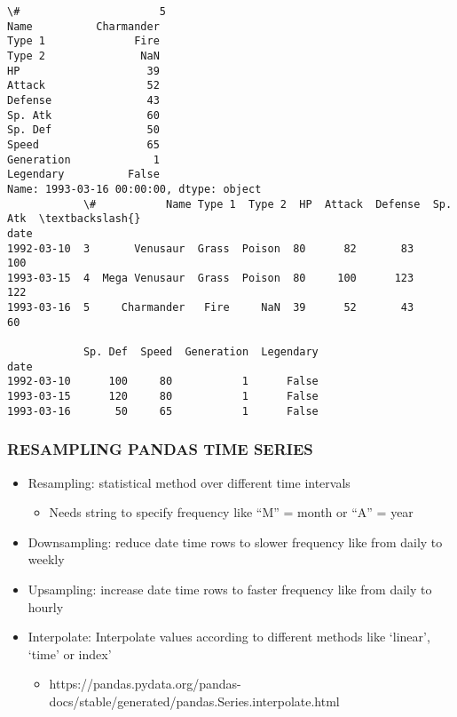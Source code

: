 \documentclass[11pt]{article}
\providecommand{\tightlist}{%
      \setlength{\itemsep}{0pt}\setlength{\parskip}{0pt}}
\begin{document}
    \begin{Verbatim}[commandchars=\\\{\}]
\#                      5
Name          Charmander
Type 1              Fire
Type 2               NaN
HP                    39
Attack                52
Defense               43
Sp. Atk               60
Sp. Def               50
Speed                 65
Generation             1
Legendary          False
Name: 1993-03-16 00:00:00, dtype: object
            \#           Name Type 1  Type 2  HP  Attack  Defense  Sp. Atk  \textbackslash{}
date                                                                        
1992-03-10  3       Venusaur  Grass  Poison  80      82       83      100   
1993-03-15  4  Mega Venusaur  Grass  Poison  80     100      123      122   
1993-03-16  5     Charmander   Fire     NaN  39      52       43       60   

            Sp. Def  Speed  Generation  Legendary  
date                                               
1992-03-10      100     80           1      False  
1993-03-15      120     80           1      False  
1993-03-16       50     65           1      False  

    \end{Verbatim}

    \hypertarget{resampling-pandas-time-series}{%
\subsubsection{RESAMPLING PANDAS TIME
SERIES}\label{resampling-pandas-time-series}}

\begin{itemize}
\tightlist
\item
  Resampling: statistical method over different time intervals

  \begin{itemize}
  \tightlist
  \item
    Needs string to specify frequency like ``M'' = month or ``A'' = year
  \end{itemize}
\item
  Downsampling: reduce date time rows to slower frequency like from
  daily to weekly
\item
  Upsampling: increase date time rows to faster frequency like from
  daily to hourly
\item
  Interpolate: Interpolate values according to different methods like
  `linear', `time' or index'

  \begin{itemize}
  \tightlist
  \item
    https://pandas.pydata.org/pandas-docs/stable/generated/pandas.Series.interpolate.html
  \end{itemize}
\end{itemize}
\end{document}
